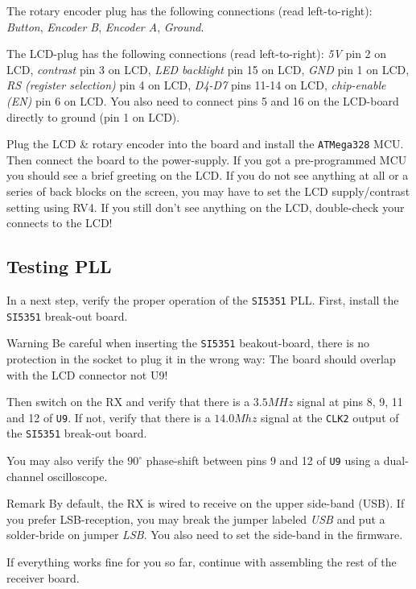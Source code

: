 \documentclass[10pt, a4paper,twoside]{scrartcl}
\newenvironment{remark}{\begin{bclogo}[couleur=blue!30,arrondi=.1,logo=\bcinfo,ombre=true]{Remark}}{\end{bclogo}}
\newenvironment{warning}{\begin{bclogo}[couleur=red!30,arrondi=.1,logo=\bcattention,ombre=true]{Warning}}{\end{bclogo}}
\begin{document}
 The rotary encoder plug has the following connections (read left-to-right): \emph{Button}, \emph{Encoder B}, \emph{Encoder A}, \emph{Ground}. 

 The LCD-plug has the following connections (read left-to-right): \emph{5V} pin 2 on LCD, \emph{contrast} pin 3 on LCD, \emph{LED backlight} pin 15 on LCD, \emph{GND} pin 1 on LCD, \emph{RS (register selection)} pin 4 on LCD, \emph{D4-D7} pins 11-14 on LCD, \emph{chip-enable (EN)} pin 6 on LCD. You also need to connect pins 5 and 16 on the LCD-board directly to ground (pin 1 on LCD).
 
 Plug the LCD \& rotary encoder into the board and install the \texttt{ATMega328} MCU. Then connect the board to the power-supply. If you got a pre-programmed MCU you should see a brief greeting on the LCD. If you do not see anything at all or a series of back blocks on the screen, you may have to set the LCD supply/contrast setting using RV4. If you still don't see anything on the LCD, double-check your connects to the LCD! 

\subsection{Testing PLL}
In a next step, verify the proper operation of the \texttt{SI5351} PLL. First, install the \texttt{SI5351} break-out board. 

\begin{warning}
 Be careful when inserting the \texttt{SI5351} beakout-board, there is no protection in the socket to plug it in the wrong way: The board should overlap with the LCD connector not U9!
\end{warning}
 
Then switch on the RX and verify that there is a $3.5MHz$ signal at pins 8, 9, 11 and 12 of \texttt{U9}. If not, verify that there is a $14.0Mhz$ signal at the \texttt{CLK2} output of the \texttt{SI5351} break-out board. 

You may also verify the $90^\circ$ phase-shift between pins 9 and 12 of \texttt{U9} using a dual-channel oscilloscope.

\begin{remark}
By default, the RX is wired to receive on the upper side-band (USB). If you prefer LSB-reception, you may break the jumper labeled \emph{USB} and put a solder-bride on jumper \emph{LSB}. You also need to set the side-band in the firmware.
\end{remark} 

If everything works fine for you so far, continue with assembling the rest of the receiver board.
\end{document}
